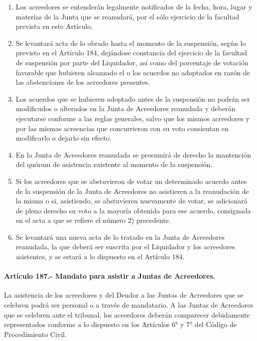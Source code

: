 \documentclass[
]{book}
\begin{document}
\begin{enumerate}
\def\labelenumi{\arabic{enumi})}
\item
  Los acreedores se entenderán legalmente notificados de la fecha, hora, lugar y materias de la Junta que se reanudará, por el sólo ejercicio de la facultad prevista en este Artículo.
\item
  Se levantará acta de lo obrado hasta el momento de la suspensión, según lo previsto en el Artículo 184, dejándose constancia del ejercicio de la facultad de suspensión por parte del Liquidador, así como del porcentaje de votación favorable que hubieren alcanzado el o los acuerdos no adoptados en razón de las abstenciones de los acreedores presentes.
\item
  Los acuerdos que se hubieren adoptado antes de la suspensión no podrán ser modificados o alterados en la Junta de Acreedores reanudada y deberán ejecutarse conforme a las reglas generales, salvo que los mismos acreedores y por las mismas acreencias que concurrieron con su voto consientan en modificarlo o dejarlo sin efecto.
\item
  En la Junta de Acreedores reanudada se presumirá de derecho la mantención del quórum de asistencia existente al momento de la suspensión.
\item
  Si los acreedores que se abstuvieron de votar un determinado acuerdo antes de la suspensión de la Junta de Acreedores no asistieren a la reanudación de la misma o si, asistiendo, se abstuvieren nuevamente de votar, se adicionará de pleno derecho su voto a la mayoría obtenida para ese acuerdo, consignada en el acta a que se refiere el número 2) precedente.
\item
  Se levantará una nueva acta de lo tratado en la Junta de Acreedores reanudada, la que deberá ser suscrita por el Liquidador y los acreedores asistentes, y se estará a lo dispuesto en el Artículo 184.
\end{enumerate}

\hypertarget{artuxedculo-187.--mandato-para-asistir-a-juntas-de-acreedores.}{%
\paragraph*{Artículo 187.- Mandato para asistir a Juntas de Acreedores.}\label{artuxedculo-187.--mandato-para-asistir-a-juntas-de-acreedores.}}

La asistencia de los acreedores y del Deudor a las Juntas de Acreedores que se celebren podrá ser personal o a través de mandatario. A las Juntas de Acreedores que se celebren ante el tribunal, los acreedores deberán comparecer debidamente representados conforme a lo dispuesto en los Artículos 6° y 7° del Código de Procedimiento Civil.
\end{document}
